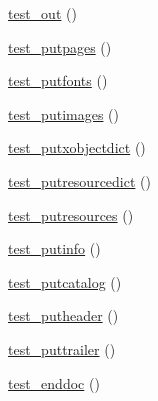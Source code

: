 \begin{DoxyCompactItemize}
\hyperlink{class_f_p_d_f_test_a263b95de6b1589a6968177b6f4e5bbba}{test\_\-out} ()
\item 
\hyperlink{class_f_p_d_f_test_a5702b175b1a43336d0535951ac4a52c2}{test\_\-putpages} ()
\item 
\hyperlink{class_f_p_d_f_test_a305b1672cfb0f28cd890b703c9082e56}{test\_\-putfonts} ()
\item 
\hyperlink{class_f_p_d_f_test_a6d869b2b1e1c07eb5069e970ec871deb}{test\_\-putimages} ()
\item 
\hyperlink{class_f_p_d_f_test_a2f8b1ef95fff501841f100f749a1f07d}{test\_\-putxobjectdict} ()
\item 
\hyperlink{class_f_p_d_f_test_aa986cecf3a66a65a53c428cd2aca622b}{test\_\-putresourcedict} ()
\item 
\hyperlink{class_f_p_d_f_test_a1779adfdb24275496427c9fe9c754a3b}{test\_\-putresources} ()
\item 
\hyperlink{class_f_p_d_f_test_a5a48e9f4563feee5eaf3a843f5307624}{test\_\-putinfo} ()
\item 
\hyperlink{class_f_p_d_f_test_ae9ce0876d92402b3af7bdddea902e183}{test\_\-putcatalog} ()
\item 
\hyperlink{class_f_p_d_f_test_a251ce2920be57d475e757d53bb86e6da}{test\_\-putheader} ()
\item 
\hyperlink{class_f_p_d_f_test_a464291a3e058de44a07fb6052e387c3c}{test\_\-puttrailer} ()
\item 
\hyperlink{class_f_p_d_f_test_a689d4b92b9535797510d9636bf22af3f}{test\_\-enddoc} ()
\end{DoxyCompactItemize}
